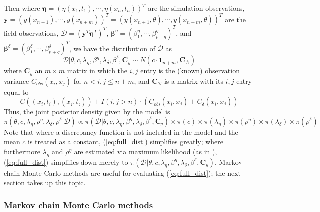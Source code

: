 \documentclass{article}
\begin{document}
Then where $\boldsymbol \eta = (\eta(x_1,t_1),\cdots,\eta(x_n,t_n))^T$ are the simulation observations, $\mathbf y = (y(x_{n+1}),\cdots,y(x_{n+m}))^T= (y(x_{n+1},\theta),\cdots,y(x_{n+m},\theta))^T$ are the field observations, $\mathcal D = (\mathbf y^T \boldsymbol \eta^T)^T$, $\boldsymbol \beta^\eta = (\beta^\eta_1,\cdots,\beta_{p+q}^\eta)^T$, and $\boldsymbol \beta^\delta = (\beta^\delta_1,\cdots,\beta_{p+q}^\delta)^T$, we have the distribution of $\mathcal D$ as
\begin{equation}
\mathcal D | \theta,c,\lambda_\eta, \beta^\eta,\lambda_\delta,\beta^\delta,\mathbf C_y \sim N(c \cdot \mathbf 1_{n+m}, \mathbf C_{\mathcal D})
\end{equation}
where $\mathbf C_y$ an $m\times m$ matrix in which the $i,j$ entry is the (known) observation variance $C_{obs}(x_i,x_j)$ for $n<i,j\leq n+m$, and $\mathbf C_{\mathcal D}$ is a matrix with its $i,j$ entry equal to
\begin{equation}
C((x_i,t_i),(x_j,t_j)) + I(i,j>n)\cdot(C_{obs}(x_i,x_j) + C_\delta(x_i,x_j))
\end{equation}
Thus, the joint posterior density given by the model is
\begin{equation} \label{eq:full_dist}
\pi(\theta,c,\lambda_\eta,\rho^\eta,\lambda_\delta,\rho^\delta|\mathcal D)
\propto \pi(\mathcal D | \theta,c,\lambda_\eta, \beta^\eta,\lambda_\delta,\beta^\delta,\mathbf C_y) \times \pi(c) \times \pi(\lambda_\eta) \times 
\pi(\rho^\eta) \times \pi(\lambda_\delta) \times \pi(\rho^\delta)
\end{equation}
Note that where a discrepancy function is not included in the model and the mean $c$ is treated as a constant, (\ref{eq:full_dist}) simplifies greatly; where furthermore $\lambda_\eta$ and $\rho^\eta$ are estimated via maximum likelihood (as in  \cite{Kennedy2001}),  (\ref{eq:full_dist}) simplifies down merely to 
$\pi(\mathcal D | \theta,c,\lambda_\eta, \beta^\eta,\lambda_\delta,\beta^\delta,\mathbf C_y)$. Markov chain Monte Carlo methods are useful for evaluating (\ref{eq:full_dist}); the next section takes up this topic.

\subsubsection{Markov chain Monte Carlo methods}

\end{document}
